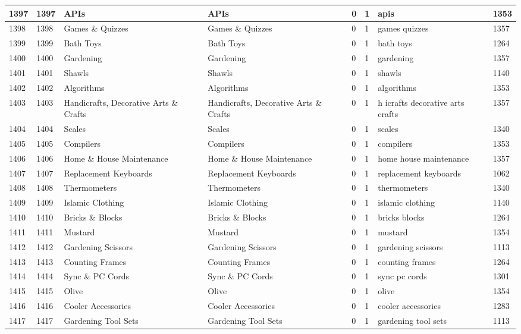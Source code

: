 \begin{longtable}{|l|l|l|l|l|l|l|l|}
1397 & 1397 & APIs & APIs & 0 & 1 & apis & 1353 \\ \hline 
1398 & 1398 & Games \& Quizzes & Games \& Quizzes & 0 & 1 & games quizzes & 1357 \\ \hline 
1399 & 1399 & Bath Toys & Bath Toys & 0 & 1 & bath toys & 1264 \\ \hline 
1400 & 1400 & Gardening & Gardening & 0 & 1 & gardening & 1357 \\ \hline 
1401 & 1401 & Shawls & Shawls & 0 & 1 & shawls & 1140 \\ \hline 
1402 & 1402 & Algorithms & Algorithms & 0 & 1 & algorithms & 1353 \\ \hline 
1403 & 1403 & Handicrafts, Decorative Arts \& Crafts & Handicrafts, Decorative Arts \& Crafts & 0 & 1 & h icrafts decorative arts crafts & 1357 \\ \hline 
1404 & 1404 & Scales & Scales & 0 & 1 & scales & 1340 \\ \hline 
1405 & 1405 & Compilers & Compilers & 0 & 1 & compilers & 1353 \\ \hline 
1406 & 1406 & Home \& House Maintenance & Home \& House Maintenance & 0 & 1 & home house maintenance & 1357 \\ \hline 
1407 & 1407 & Replacement Keyboards & Replacement Keyboards & 0 & 1 & replacement keyboards & 1062 \\ \hline 
1408 & 1408 & Thermometers & Thermometers & 0 & 1 & thermometers & 1340 \\ \hline 
1409 & 1409 & Islamic Clothing & Islamic Clothing & 0 & 1 & islamic clothing & 1140 \\ \hline 
1410 & 1410 & Bricks \& Blocks & Bricks \& Blocks & 0 & 1 & bricks blocks & 1264 \\ \hline 
1411 & 1411 & Mustard & Mustard & 0 & 1 & mustard & 1354 \\ \hline 
1412 & 1412 & Gardening Scissors & Gardening Scissors & 0 & 1 & gardening scissors & 1113 \\ \hline 
1413 & 1413 & Counting Frames & Counting Frames & 0 & 1 & counting frames & 1264 \\ \hline 
1414 & 1414 & Sync \& PC Cords & Sync \& PC Cords & 0 & 1 & sync pc cords & 1301 \\ \hline 
1415 & 1415 & Olive & Olive & 0 & 1 & olive & 1354 \\ \hline 
1416 & 1416 & Cooler Accessories & Cooler Accessories & 0 & 1 & cooler accessories & 1283 \\ \hline 
1417 & 1417 & Gardening Tool Sets & Gardening Tool Sets & 0 & 1 & gardening tool sets & 1113 \\ \hline 

\end{longtable}
